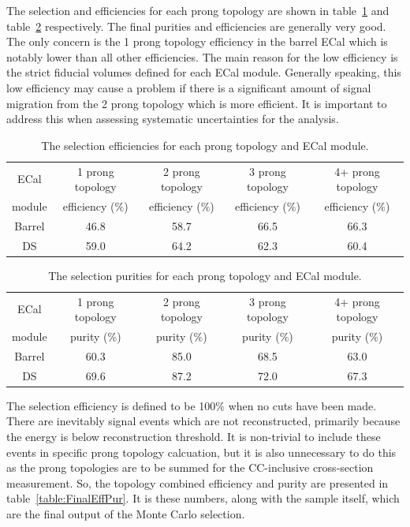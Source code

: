 \newline
\newline
The selection and efficiencies for each prong topology are shown in table~\ref{table:SelEfficiency} and table~\ref{table:SelPurity} respectively.  The final purities and efficiencies are generally very good.  The only concern is the 1 prong topology efficiency in the barrel ECal which is notably lower than all other efficiencies.  The main reason for the low efficiency is the strict fiducial volumes defined for each ECal module.  Generally speaking, this low efficiency may cause a problem if there is a significant amount of signal migration from the 2 prong topology which is more efficient.  It is important to address this when assessing systematic uncertainties for the analysis.
\begin{table}
  \begin{tabular}{ c c c c c }
    ECal & 1 prong topology & 2 prong topology & 3 prong topology & 4+ prong topology \\
    module & efficiency ($\%$)& efficiency ($\%$)& efficiency ($\%$)& efficiency ($\%$) \\ \hline \hline
    Barrel & 46.8 & 58.7 & 66.5 & 66.3 \\
    DS & 59.0 & 64.2 & 62.3 & 60.4\\
  \end{tabular}
  \caption{The selection efficiencies for each prong topology and ECal module.}
  \label{table:SelEfficiency}
\end{table}
\begin{table}
  \begin{tabular}{ c c c c c }
    ECal & 1 prong topology & 2 prong topology & 3 prong topology & 4+ prong topology \\
    module & purity ($\%$)& purity ($\%$)& purity ($\%$)& purity ($\%$) \\ \hline \hline
    Barrel & 60.3 & 85.0 & 68.5 & 63.0\\
    DS & 69.6 & 87.2 & 72.0 & 67.3\\
  \end{tabular}
  \caption{The selection purities for each prong topology and ECal module.}
  \label{table:SelPurity}
\end{table}
\newline
\newline
The selection efficiency is defined to be 100$\%$ when no cuts have been made.  There are inevitably signal events which are not reconstructed, primarily because the energy is below reconstruction threshold.  It is non-trivial to include these events in specific prong topology calcuation, but it is also unnecessary to do this as the prong topologies are to be summed for the CC-inclusive cross-section measurement.  So, the topology combined efficiency and purity are presented in table~\ref{table:FinalEffPur}.  It is these numbers, along with the sample itself, which are the final output of the Monte Carlo selection.

